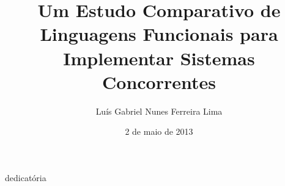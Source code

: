 \documentclass[bsc,oneside]{ufpethesis/ufpethesis}
\title{Um Estudo Comparativo de Linguagens Funcionais para Implementar Sistemas Concorrentes}
\author{Luís Gabriel Nunes Ferreira Lima}
\date{2 de maio de 2013} %
\institute{Centro de Informática}
\begin{document}
\frontmatter

\frontpage

\presentationpage

\begin{dedicatory}
dedicatória
\end{dedicatory}

\acknowledgements


\resumo


\abstract


\tableofcontents

\mainmatter







\backmatter

\nocite{*}


\end{document}
